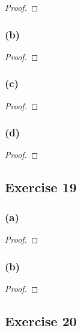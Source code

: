 \documentclass[14pt]{extarticle}
\begin{document}
\begin{proof}

\end{proof}

\subsubsection{(b)}

\begin{proof}

\end{proof}

\subsubsection{(c)}

\begin{proof}

\end{proof}

\subsubsection{(d)}

\begin{proof}

\end{proof}

\subsection{Exercise 19}

\subsubsection{(a)}

\begin{proof}

\end{proof}

\subsubsection{(b)}

\begin{proof}

\end{proof}

\subsection{Exercise 20}
\end{document}
